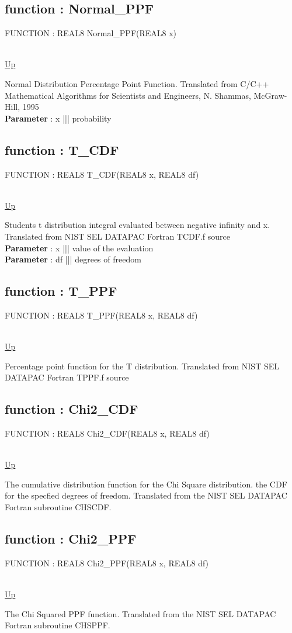 \subsection*{function : Normal\_PPF}
\hypertarget{ecldoc:ml_core.math.distributions.normal_ppf}{FUNCTION : REAL8 Normal\_PPF(REAL8 x)} \\
\hyperlink{ecldoc:ML_Core.Math.Distributions}{Up} \\
\par
Normal Distribution Percentage Point Function. Translated from C/C++ Mathematical Algorithms for Scientists and Engineers, N. Shammas, McGraw-Hill, 1995 \\
\textbf{Parameter} : x ||| probability \\
\subsection*{function : T\_CDF}
\hypertarget{ecldoc:ml_core.math.distributions.t_cdf}{FUNCTION : REAL8 T\_CDF(REAL8 x, REAL8 df)} \\
\hyperlink{ecldoc:ML_Core.Math.Distributions}{Up} \\
\par
Students t distribution integral evaluated between negative infinity and x. Translated from NIST SEL DATAPAC Fortran TCDF.f source \\
\textbf{Parameter} : x ||| value of the evaluation \\
\textbf{Parameter} : df ||| degrees of freedom \\
\subsection*{function : T\_PPF}
\hypertarget{ecldoc:ml_core.math.distributions.t_ppf}{FUNCTION : REAL8 T\_PPF(REAL8 x, REAL8 df)} \\
\hyperlink{ecldoc:ML_Core.Math.Distributions}{Up} \\
\par
Percentage point function for the T distribution. Translated from NIST SEL DATAPAC Fortran TPPF.f source \\
\subsection*{function : Chi2\_CDF}
\hypertarget{ecldoc:ml_core.math.distributions.chi2_cdf}{FUNCTION : REAL8 Chi2\_CDF(REAL8 x, REAL8 df)} \\
\hyperlink{ecldoc:ML_Core.Math.Distributions}{Up} \\
\par
The cumulative distribution function for the Chi Square distribution. the CDF for the specfied degrees of freedom. Translated from the NIST SEL DATAPAC Fortran subroutine CHSCDF. \\
\subsection*{function : Chi2\_PPF}
\hypertarget{ecldoc:ml_core.math.distributions.chi2_ppf}{FUNCTION : REAL8 Chi2\_PPF(REAL8 x, REAL8 df)} \\
\hyperlink{ecldoc:ML_Core.Math.Distributions}{Up} \\
\par
The Chi Squared PPF function. Translated from the NIST SEL DATAPAC Fortran subroutine CHSPPF. \\


